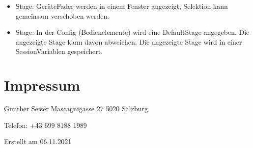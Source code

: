 \documentclass[letterpaper,10pt,ngerman]{sphinxmanual}
\begin{document}
\begin{itemize}
\begin{itemize}
\item {} 
Stage: Geräte\sphinxhyphen{}Fader werden in einem Fenster angezeigt, Selektion kann gemeinsam
verschoben werden.

\item {} 
Stage: In der Config (Bedienelemente) wird eine Default\sphinxhyphen{}Stage angegeben. Die
angezeigte Stage kann davon abweichen: Die angezeigte Stage wird in einer
Session\sphinxhyphen{}Variablen gespeichert.

\end{itemize}

\end{itemize}


\chapter{Impressum}
\label{\detokenize{impressum:impressum}}\label{\detokenize{impressum::doc}}
Gunther Seiser
Mascagnigasse 27
5020 Salzburg

Telefon: +43 699 8188 1989


Erstellt  am 06.11.2021



\renewcommand{\indexname}{Stichwortverzeichnis}
\printindex
\end{document}
